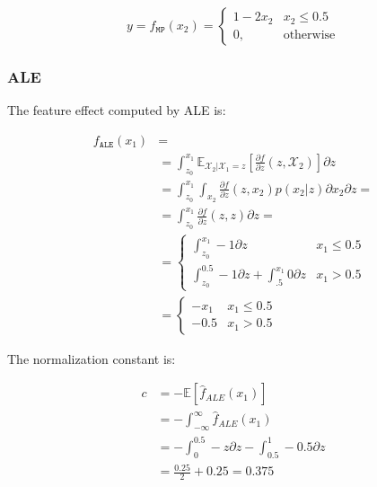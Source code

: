 \documentclass[wcp]{jmlr}
\begin{document}
\begin{equation}
  y = f_{\mathtt{MP}}(x_2) =
  \begin{cases}
    1 - 2x_2 & x_2 \leq 0.5 \\
    0, &\text{otherwise}
  \end{cases}
\end{equation}

\subsubsection*{ALE}

The feature effect computed by ALE is:

\begin{equation}
  \label{eq:example-1-ale}
  \begin{split}
    f_{\mathtt{ALE}}(x_1) &= \\
    & = \int_{z_0}^{x_1} \mathbb{E}_{\mathcal{X}_2|\mathcal{X}_1=z} \left [\frac{\partial f}{\partial z}(z, \mathcal{X}_2) \right ] \partial z \\
    & = \int_{z_0}^{x_1} \int_{x_2} \frac{\partial f}{\partial z}(z,x_2) p(x_2|z)  \partial x_2 \partial z = \\
    & = \int_{z_0}^{x_1} \frac{\partial f}{\partial z}(z,z) \partial z = \\
    & = \begin{cases}
      \int_{z_0}^{x_1} -1 \partial z & x_1 \leq 0.5 \\
      \int_{z_0}^{0.5} -1 \partial z + \int_{.5}^{x_1} 0 \partial z & x_1 > 0.5
    \end{cases} \\
    & = \begin{cases}
      -x_1 & x_1 \leq 0.5 \\
      -0.5 & x_1 > 0.5
    \end{cases}
  \end{split}
\end{equation}

The normalization constant is:

\begin{equation}
  \label{eq:constant}
  \begin{split}
    c & = - \mathbb{E}[\hat{f}_{ALE}(x_1)] \\
    & = - \int_{-\infty}^{\infty} \hat{f}_{ALE}(x_1) \\
    & = - \int_{0}^{0.5} - z \partial z - \int_{0.5}^{1} -0.5 \partial z \\
    & = \frac{0.25}{2} + 0.25 = 0.375
  \end{split}
\end{equation}
\end{document}

